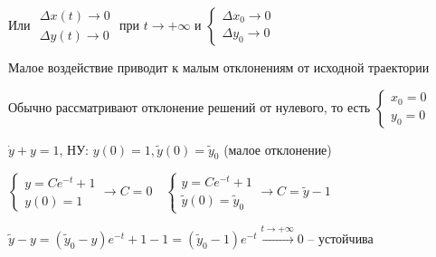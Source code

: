 \documentclass[12pt]{article}
\begin{document}
    Или $\begin{matrix}\Delta x (t) \to 0 \\ \Delta y (t) \to 0\end{matrix}$ при $t \to +\infty$ и $\begin{cases}\Delta x_0 \to 0 \\ \Delta y_0 \to 0\end{cases}$

    \Nota Малое воздействие приводит к малым отклонениям от исходной траектории

    \Nota Обычно рассматривают отклонение решений от нулевого, то есть $\begin{cases}x_0 = 0 \\ y_0 = 0\end{cases}$

    \Ex $\dot y + y = 1$, НУ: $y(0) = 1, \tilde{y}(0) = \tilde{y}_0$ (малое отклонение)

    $\begin{cases}y = Ce^{-t} + 1 \\ y(0) = 1\end{cases} \rightarrow C = 0 \quad
    \begin{cases}y = Ce^{-t} + 1 \\ \tilde{y}(0) = \tilde{y}_0\end{cases} \to C = \tilde{y} - 1$

    $\tilde{y} - y = (\tilde{y}_0 - y) e^{-t} + 1 - 1 = (\tilde{y}_0 - 1)e^{-t} \stackrel{t \to +\infty}{\longrightarrow} 0$ -- устойчива{\Large 🥳}
\end{document}

